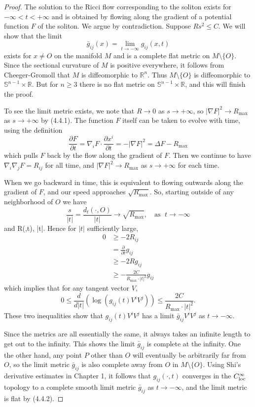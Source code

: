 \begin{proof}
The solution to the Ricci flow corresponding to the soliton exists
for $-\infty<t<+\infty$ and is obtained by flowing along the
gradient of a potential function $F$ of the soliton. We argue by
contradiction. Suppose $Rs^2\le C$. We will show that the limit
$$
\bar{g}_{ij}(x)=\lim_{t\rightarrow-\infty}g_{ij}(x,t)
$$
exists for $x\neq O$ on the manifold $M$ and is a complete flat
metric on $M\setminus\{O\}.$ Since the sectional curvature of $M$
is positive everywhere, it follows from Cheeger-Gromoll \cite{CG}
that $M$ is diffeomorphic to $\mathbb{R}^n$. Thus
$M\setminus\{O\}$ is diffeomorphic to
$\mathbb{S}^{n-1}\times\mathbb{R}$. But for $n\ge 3$ there is no
flat metric on $\mathbb{S}^{n-1}\times\mathbb{R}$, and this will
finish the proof.

To see the limit metric exists, we note that $R\rightarrow 0$ as
$s\rightarrow+\infty$, so $|\nabla F|^2\rightarrow R_{\max}$ as
$s\rightarrow +\infty$ by (4.4.1). The function $F$ itself can be
taken to evolve with time, using the definition
$$
\frac{\partial F}{\partial t} =\nabla_iF\cdot\frac{\partial
x^i}{\partial t} =-|\nabla F|^2 =\Delta F-R_{\max}
$$
which pulls $F$ back by the flow along the gradient of $F$. Then
we continue to have $\nabla_i\nabla_jF=R_{ij}$ for all time, and
$|\nabla F|^2\rightarrow R_{\max}$ as $s\rightarrow +\infty$ for
each time.

When we go backward in time, this is equivalent to flowing
outwards along the gradient of $F$, and our speed approaches
$\sqrt{R_{\max}}$. So, starting outside of any neighborhood of $O$
we have
$$
\frac{s}{|t|}=\frac{d_t(\cdot,O)}{|t|}\rightarrow
\sqrt{R_{\max}},\quad \text{as }\;t\rightarrow-\infty
$$
and \be R(\cdot,t)\le{},\quad
{}\;|t|\;.  %
\ee Hence for $|t|$ sufficiently large,
\begin{align*}
0&  \ge -2R_{ij}\\
&  = \frac{\partial}{\partial t}g_{ij}\\
&  \ge -2Rg_{ij}\\
&  \ge -\frac{2C}{R_{\max}\cdot|t|^2}g_{ij}
\end{align*}
which implies that for any tangent vector $V$,
$$
0\le \frac{d}{d|t|}(\log(g_{ij}(t)V^iV^j))
\le\frac{2C}{R_{\max}\cdot|t|^2}.
$$
These two inequalities show that $g_{ij}(t)V^iV^j$ has a limit
$\bar{g}_{ij}V^iV^j$ as $t\rightarrow-\infty$.

Since the metrics are all essentially the same, it always takes an
infinite length to get out to the infinity. This shows the limit
$\bar{g}_{ij}$ is complete at the infinity. One the other hand,
any point $P$ other than $O$ will eventually be arbitrarily far
from $O$, so the limit metric $\bar{g}_{ij}$ is also complete away
from $O$ in $M\setminus\{O\}$. Using Shi's derivative estimates in
Chapter 1, it follows that $g_{ij}(\cdot,t)$ converges in the
$C_{\rm loc}^\infty$ topology to a complete smooth limit metric
$\bar{g}_{ij}$ as $t\rightarrow-\infty$, and the limit metric is
flat by (4.4.2).
\end{proof}

